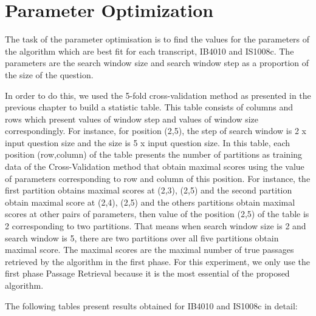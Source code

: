 \normalsize


\section{Parameter Optimization}

The task of the parameter optimisation is to find the values for the parameters of the algorithm which are best fit for each transcript, IB4010 and IS1008c. The parameters are the search window size and search window step as a proportion of the size of the question. 

In order to do this, we used the 5-fold cross-validation method as presented in the previous chapter to build a statistic table. This table consists of columns and rows which present values of window step and values of window size correspondingly. For instance, for position (2,5), the step of search window is 2 x input question size and the size is 5 x input question size. In this table, each position (row,column) of the table presents the number of partitions as training data of the Cross-Validation method that obtain maximal scores using the value of parameters corresponding to row and column of this position. For instance, the first partition obtains maximal scores at (2,3), (2,5) and the second partition obtain maximal score at (2,4), (2,5) and the others partitions obtain maximal scores at other pairs of parameters, then value of the position (2,5) of the table is 2 corresponding to two partitions. That means when search window size is 2 and search window is 5, there are two partitions over all five partitions obtain maximal score. The maximal scores are the maximal number of true passages retrieved by the algorithm in the first phase. For this experiment, we only use the first phase Passage Retrieval because it is the most essential of the proposed algorithm.

The following tables present results obtained for IB4010 and IS1008c in detail:


